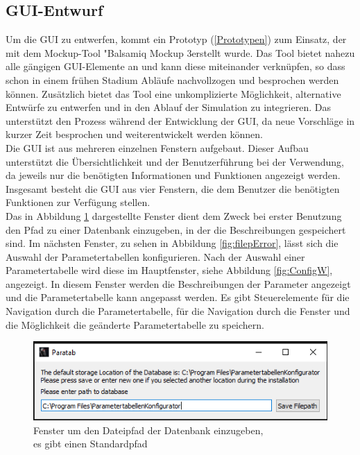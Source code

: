 \subsection{GUI-Entwurf}
Um die \ac{GUI} zu entwerfen, kommt ein Prototyp (\ref{Prototypen}) zum Einsatz, der mit dem Mockup-Tool "Balsamiq Mockup 3\grqq\space erstellt wurde. Das Tool bietet nahezu alle gängigen \ac{GUI}-Elemente an und kann diese miteinander verknüpfen, so dass schon in einem frühen Stadium Abläufe nachvollzogen und besprochen werden können. Zusätzlich bietet das Tool eine unkomplizierte Möglichkeit, alternative Entwürfe zu entwerfen und in den Ablauf der Simulation zu integrieren. Das unterstützt den Prozess während der Entwicklung der \ac{GUI}, da neue Vorschläge in kurzer Zeit besprochen und weiterentwickelt werden können.\\
\newline
Die \ac{GUI} ist aus mehreren einzelnen Fenstern aufgebaut. Dieser Aufbau unterstützt die Übersichtlichkeit und der Benutzerführung bei der Verwendung, da jeweils nur die benötigten Informationen und Funktionen angezeigt werden.\\ 
Insgesamt besteht die \ac{GUI} aus vier Fenstern, die dem Benutzer die benötigten Funktionen zur Verfügung stellen. \\
Das in Abbildung \ref{fig:filep} dargestellte Fenster dient dem Zweck bei erster Benutzung den Pfad zu einer Datenbank einzugeben, in der die Beschreibungen gespeichert sind. Im nächsten Fenster, zu sehen in Abbildung \ref{fig:filepError}, lässt sich die Auswahl der Parametertabellen konfigurieren. Nach der Auswahl einer Parametertabelle wird diese im Hauptfenster, siehe Abbildung \ref{fig:ConfigW}, angezeigt. In diesem Fenster werden die Beschreibungen der Parameter angezeigt und die Parametertabelle kann angepasst werden. Es gibt Steuerelemente für die Navigation durch die Parametertabelle, für die Navigation durch die Fenster und die Möglichkeit die geänderte Parametertabelle zu speichern.\\
\begin{figure}[H]
\includegraphics[scale=1]{pictures_and_research/Bilder/filepathWindow.PNG}
\caption{Fenster um den Dateipfad der Datenbank einzugeben,\\
es gibt einen Standardpfad}
\label{fig:filep}
\end{figure}
